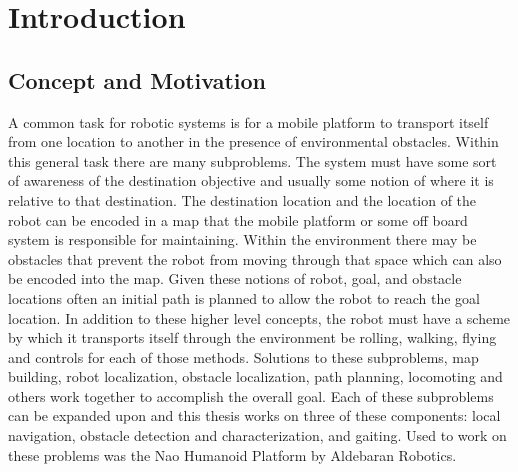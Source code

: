 \chapter{Introduction} \label{ch::introduction}

\section{Concept and Motivation}
A common task for robotic systems is for a mobile platform to transport itself from one location to another
in the presence of environmental obstacles. Within this general task there are many subproblems. The system
must have some sort of awareness of the destination objective and usually some notion of where it is relative
to that destination. The destination location and the location of the robot can be encoded in a map that
the mobile platform or some off board system is responsible for maintaining. Within the environment there may 
be obstacles that prevent the robot from moving through that space which can also be encoded into the map. 
Given these notions of robot, goal, and obstacle locations often an initial path is planned to allow the robot
to reach the goal location. In addition to these higher level concepts, the robot must have a scheme by which it
transports itself through the environment be rolling, walking, flying and controls for each of those methods.
Solutions to these subproblems, map building, robot localization, obstacle localization,
path planning, locomoting and others work together to accomplish the overall goal. 
Each of these subproblems can be expanded upon and this thesis works on three of these components: 
local navigation, obstacle detection and characterization, and gaiting. Used to work on these problems
was the Nao Humanoid Platform by Aldebaran Robotics.

